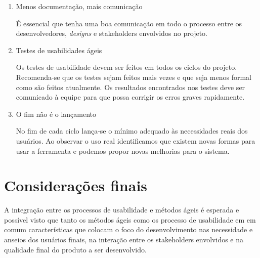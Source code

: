 \begin{enumerate}
\item Menos documentação, mais comunicação

	É essencial que tenha uma boa comunicação em todo o processo entre os desenvolvedores, \emph{designs} e stakeholders envolvidos no projeto.



\item Testes de usabilidades ágeis

	Os testes de usabilidade devem ser feitos em todos os ciclos do projeto. Recomenda-se que os testes sejam feitos mais vezes e que seja menos formal como são feitos atualmente. Os resultados encontrados nos testes deve ser comunicado à equipe para que possa corrigir os erros  graves rapidamente.


\item O fim não é o lançamento

	No fim de cada ciclo lança-se o mínimo adequado às necessidades reais dos usuários. Ao observar o uso real identificamos que existem novas formas para usar a ferramenta e podemos propor novas melhorias para o sistema. 
	
\end{enumerate}


\section{Considerações finais}

	A integração entre os processos de usabilidade e métodos ágeis é esperada e possível visto que tanto os métodos ágeis como os processo de usabilidade em em comum características que colocam o foco do desenvolvimento nas necessidade e anseios dos usuários finais, na interação entre os stakeholders envolvidos e na qualidade final do produto a ser desenvolvido.






